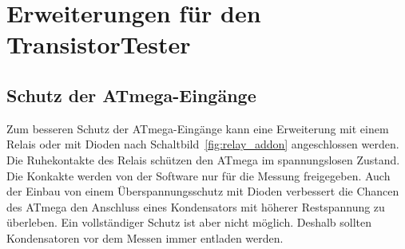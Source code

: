 \section{Erweiterungen für den TransistorTester}


\subsection{Schutz der ATmega-Eingänge}  

Zum besseren Schutz der ATmega-Eingänge kann eine Erweiterung mit einem Relais oder mit Dioden
nach Schaltbild~\ref{fig:relay_addon} angeschlossen werden.
Die Ruhekontakte des Relais schützen den ATmega im spannungslosen Zustand.
Die Konkakte werden von der Software nur für die Messung freigegeben.
Auch der Einbau von einem Überspannungsschutz mit Dioden verbessert die Chancen des ATmega
den Anschluss eines Kondensators mit höherer Restspannung zu überleben.
Ein vollständiger Schutz ist aber nicht möglich. Deshalb sollten Kondensatoren vor dem Messen immer
entladen werden.

